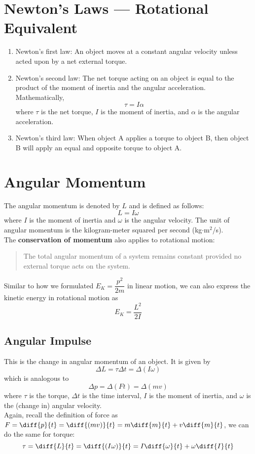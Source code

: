 \documentclass[a4paper,12pt]{article}
\let\oldsection\section
\renewcommand\section{\clearpage\oldsection}
\newcommand{\lb}{\\[8pt]}
\begin{document}
\section{Newton's Laws --- Rotational Equivalent}

\begin{enumerate}
  \item Newton's first law: An object moves at a constant angular velocity unless acted upon by a net external torque.
  \item Newton's second law: The net torque acting on an object is equal to the product of the moment of inertia and the angular acceleration. Mathematically, $$\tau = I\alpha$$where $\tau$ is the net torque, $I$ is the moment of inertia, and $\alpha$ is the angular acceleration.
  \item Newton's third law: When object A applies a torque to object B, then object B will apply an equal and opposite torque to object A.
\end{enumerate}

\section{Angular Momentum}

The angular momentum is denoted by $L$ and is defined as follows:
$$L = I\omega$$where $I$ is the moment of inertia and $\omega$ is the angular velocity. The unit of angular momentum is the kilogram-meter squared per second (kg$\cdot$m$^2$/s).\lb
The \textbf{conservation of momentum} also applies to rotational motion:
\begin{quote}
  The total angular momentum of a system remains constant provided no
  external torque acts on the system.
\end{quote}
Similar to how we formulated $E_K = \dfrac{p^2}{2m}$ in linear motion, we can also express the kinetic energy in rotational motion as $$E_K = \dfrac{L^2}{2I}$$

\subsection{Angular Impulse}

This is the change in angular momentum of an object. It is given by $$\Delta L = \tau \Delta t = \Delta(I\omega)$$which is analogous to$$\Delta p = \Delta(Ft) = \Delta(mv)$$where $\tau$ is the torque, $\Delta t$ is the time interval, $I$ is the moment of inertia, and $\omega$ is the (change in) angular velocity.\lb
Again, recall the definition of force as $F = \diff{p}{t} = \diff{(mv)}{t} = m\diff{m}{t} + v\diff{m}{t}$, we can do the same for torque: $$\tau = \diff{L}{t} = \diff{(I\omega)}{t} = I\diff{\omega}{t} + \omega\diff{I}{t}$$
\end{document}
